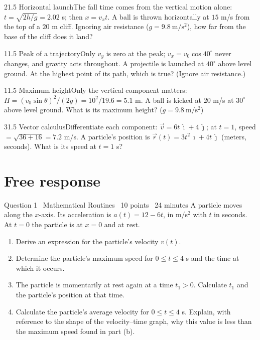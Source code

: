 \documentclass[11pt]{article}
\begin{document}
\begin{q}{2}{1.5 Horizontal launch}{The fall time comes from the vertical motion alone: $t = \sqrt{2h/g} = 2.02$ s; then $x = v_x t$.}
A ball is thrown horizontally at $15$ m/s from the top of a $20$ m cliff. Ignoring air resistance ($g = 9.8\ \mathrm{m/s^2}$), how far from the base of the cliff does it land?
\end{q}
\begin{q}{1}{1.5 Peak of a trajectory}{Only $v_y$ is zero at the peak; $v_x = v_0\cos 40^\circ$ never changes, and gravity acts throughout.}
A projectile is launched at $40^\circ$ above level ground. At the highest point of its path, which is true? (Ignore air resistance.)
\end{q}
\begin{q}{1}{1.5 Maximum height}{Only the vertical component matters: $H = (v_0 \sin\theta)^2/(2g) = 10^2/19.6 = 5.1$ m.}
A ball is kicked at $20$ m/s at $30^\circ$ above level ground. What is its maximum height? ($g = 9.8\ \mathrm{m/s^2}$)
\end{q}
\begin{q}{3}{1.5 Vector calculus}{Differentiate each component: $\vec v = 6t\,\hat\imath + 4\,\hat\jmath$; at $t = 1$, speed $= \sqrt{36 + 16} = 7.2$ m/s.}
A particle's position is $\vec r(t) = 3t^2\,\hat\imath + 4t\,\hat\jmath$ (meters, seconds). What is its speed at $t = 1$ s?
\end{q}

\section{Free response}

\begin{frq}{Question 1 \textperiodcentered\ Mathematical Routines \textperiodcentered\ 10 points \textperiodcentered\ 24 minutes}
A particle moves along the $x$-axis. Its acceleration is $a(t) = 12 - 6t$, in m/s$^2$ with $t$ in seconds. At $t = 0$ the particle is at $x = 0$ and at rest.

\begin{enumerate}[label=(\alph*),leftmargin=2em,itemsep=4pt]
\item Derive an expression for the particle's velocity $v(t)$. 
\item Determine the particle's maximum speed for $0 \le t \le 4$ s and the time at which it occurs. 
\item The particle is momentarily at rest again at a time $t_1 > 0$. Calculate $t_1$ and the particle's position at that time. 
\item Calculate the particle's average velocity for $0 \le t \le 4$ s. Explain, with reference to the shape of the velocity--time graph, why this value is less than the maximum speed found in part (b). 
\end{enumerate}
\end{frq}
\end{document}

